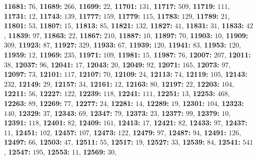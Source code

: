 \textsf{\bfseries 11681:} $76$, \textsf{\bfseries 11689:} $266$, \textsf{\bfseries 11699:} $22$, \textsf{\bfseries 11701:} $131$, \textsf{\bfseries 11717:} $509$, \textsf{\bfseries 11719:} $111$, \textsf{\bfseries 11731:} $12$, \textsf{\bfseries 11743:} $139$, \textsf{\bfseries 11777:} $159$, \textsf{\bfseries 11779:} $115$, \textsf{\bfseries 11783:} $129$, \textsf{\bfseries 11789:} $21$, \textsf{\bfseries 11801:} $53$, \textsf{\bfseries 11807:} $15$, \textsf{\bfseries 11813:} $85$, \textsf{\bfseries 11821:} $132$, \textsf{\bfseries 11827:} $41$, \textsf{\bfseries 11831:} $31$, \textsf{\bfseries 11833:} $42$, \textsf{\bfseries 11839:} $97$, \textsf{\bfseries 11863:} $22$, \textsf{\bfseries 11867:} $210$, \textsf{\bfseries 11887:} $10$, \textsf{\bfseries 11897:} $70$, \textsf{\bfseries 11903:} $10$, \textsf{\bfseries 11909:} $309$, \textsf{\bfseries 11923:} $87$, \textsf{\bfseries 11927:} $329$, \textsf{\bfseries 11933:} $67$, \textsf{\bfseries 11939:} $120$, \textsf{\bfseries 11941:} $83$, \textsf{\bfseries 11953:} $120$, \textsf{\bfseries 11959:} $12$, \textsf{\bfseries 11969:} $235$, \textsf{\bfseries 11971:} $109$, \textsf{\bfseries 11981:} $15$, \textsf{\bfseries 11987:} $76$, \textsf{\bfseries 12007:} $207$, \textsf{\bfseries 12011:} $38$, \textsf{\bfseries 12037:} $96$, \textsf{\bfseries 12041:} $17$, \textsf{\bfseries 12043:} $20$, \textsf{\bfseries 12049:} $92$, \textsf{\bfseries 12071:} $165$, \textsf{\bfseries 12073:} $97$, \textsf{\bfseries 12097:} $73$, \textsf{\bfseries 12101:} $117$, \textsf{\bfseries 12107:} $70$, \textsf{\bfseries 12109:} $24$, \textsf{\bfseries 12113:} $74$, \textsf{\bfseries 12119:} $105$, \textsf{\bfseries 12143:} $232$, \textsf{\bfseries 12149:} $29$, \textsf{\bfseries 12157:} $34$, \textsf{\bfseries 12161:} $12$, \textsf{\bfseries 12163:} $80$, \textsf{\bfseries 12197:} $22$, \textsf{\bfseries 12203:} $104$, \textsf{\bfseries 12211:} $56$, \textsf{\bfseries 12227:} $122$, \textsf{\bfseries 12239:} $118$, \textsf{\bfseries 12241:} $111$, \textsf{\bfseries 12251:} $13$, \textsf{\bfseries 12253:} $468$, \textsf{\bfseries 12263:} $89$, \textsf{\bfseries 12269:} $77$, \textsf{\bfseries 12277:} $24$, \textsf{\bfseries 12281:} $14$, \textsf{\bfseries 12289:} $19$, \textsf{\bfseries 12301:} $104$, \textsf{\bfseries 12323:} $140$, \textsf{\bfseries 12329:} $37$, \textsf{\bfseries 12343:} $69$, \textsf{\bfseries 12347:} $79$, \textsf{\bfseries 12373:} $23$, \textsf{\bfseries 12377:} $99$, \textsf{\bfseries 12379:} $10$, \textsf{\bfseries 12391:} $118$, \textsf{\bfseries 12401:} $82$, \textsf{\bfseries 12409:} $161$, \textsf{\bfseries 12413:} $17$, \textsf{\bfseries 12421:} $82$, \textsf{\bfseries 12433:} $97$, \textsf{\bfseries 12437:} $11$, \textsf{\bfseries 12451:} $102$, \textsf{\bfseries 12457:} $107$, \textsf{\bfseries 12473:} $122$, \textsf{\bfseries 12479:} $97$, \textsf{\bfseries 12487:} $94$, \textsf{\bfseries 12491:} $126$, \textsf{\bfseries 12497:} $66$, \textsf{\bfseries 12503:} $47$, \textsf{\bfseries 12511:} $55$, \textsf{\bfseries 12517:} $19$, \textsf{\bfseries 12527:} $33$, \textsf{\bfseries 12539:} $84$, \textsf{\bfseries 12541:} $541$, \textsf{\bfseries 12547:} $195$, \textsf{\bfseries 12553:} $11$, \textsf{\bfseries 12569:} $30$, 
